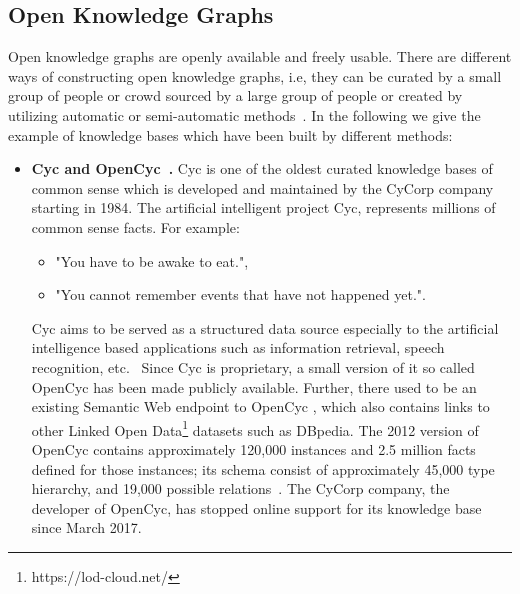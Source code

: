 \subsection{Open Knowledge Graphs} 
Open knowledge graphs are openly available and freely usable. There are different ways of constructing open knowledge graphs, i.e, they can be curated by a small group of people or crowd sourced by a large group of people or created by utilizing automatic or semi-automatic methods~\cite{DBLP:journals/semweb/Paulheim17}. In the following we give the example of knowledge bases which have been built by different methods:
\begin{itemize}
\item \textbf{Cyc and OpenCyc~\cite{DBLP:journals/cacm/Lenat95}.} Cyc is one of the oldest curated knowledge bases of common sense which is developed and maintained by the CyCorp company starting in 1984. The artificial intelligent project Cyc, represents millions of common sense facts. For example:
\begin{itemize}
\item"You have to be awake to eat.", 
\item"You cannot remember events that have not happened yet.".
\end{itemize}
Cyc aims to be served as a structured data source especially to the artificial intelligence based applications such as information retrieval, speech recognition, etc.~\cite{DBLP:journals/cacm/Lenat95}
Since Cyc is proprietary, a small version of it so called OpenCyc has been made publicly available. Further, there used to be an existing Semantic Web endpoint to OpenCyc%
, which also contains links to other Linked Open Data\footnote{https://lod-cloud.net/} datasets such as DBpedia. The 2012 version of OpenCyc contains approximately 120,000 instances and 2.5 million facts defined for those instances; its schema consist of approximately 45,000 type hierarchy, and 19,000 possible relations~\cite{DBLP:journals/semweb/Paulheim17}. The CyCorp company, the developer of OpenCyc, has stopped online support for its knowledge base since March 2017.\\


\end{itemize}
